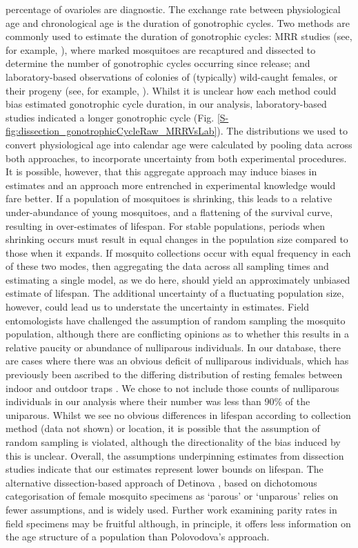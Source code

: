 \documentclass[]{article}
\begin{document}
percentage of ovarioles are diagnostic. The exchange rate between
physiological age and chronological age is the duration of gonotrophic
cycles. Two methods are commonly used to estimate the duration of
gonotrophic cycles: MRR studies (see, for example, \cite{gillies1965study}), where marked mosquitoes are recaptured and dissected to determine
the number of gonotrophic cycles occurring since release; and
laboratory-based observations of colonies of (typically) wild-caught
females, or their progeny (see, for example, \cite{afrane2005effects}).
Whilst it is unclear how each method could bias estimated gonotrophic
cycle duration, in our analysis, laboratory-based studies indicated a
longer gonotrophic cycle (Fig. \ref{S-fig:dissection_gonotrophicCycleRaw_MRRVsLab}). The distributions we used to
convert physiological age into calendar age were calculated by pooling
data across both approaches, to incorporate uncertainty from both
experimental procedures. It is possible, however, that this aggregate
approach may induce biases in estimates and an approach more entrenched
in experimental knowledge would fare better. If a population of
mosquitoes is shrinking, this leads to a relative under-abundance of
young mosquitoes, and a flattening of the survival curve, resulting in
over-estimates of lifespan. For stable populations, periods when
shrinking occurs must result in equal changes in the population size
compared to those when it expands. If mosquito collections occur with
equal frequency in each of these two modes, then aggregating the data
across all sampling times and estimating a single model, as we do here,
should yield an approximately unbiased estimate of lifespan. The
additional uncertainty of a fluctuating population size, however, could
lead us to understate the uncertainty in estimates. Field entomologists
have challenged the assumption of random sampling the mosquito
population, although there are conflicting opinions as to whether this
results in a relative paucity \citep{gillies1965study} or abundance
\citep{clements1981analysis} of nulliparous individuals. In our
database, there are cases where there was an obvious deficit of
nulliparous individuals, which has previously been ascribed to the
differing distribution of resting females between indoor and outdoor
traps \citep{detinova1962age,clements1981analysis}. We chose to not
include those counts of nulliparous individuals in our analysis where
their number was less than 90\% of the uniparous. Whilst we see no
obvious differences in lifespan according to collection method (data not
shown) or location, it is possible that the assumption of random
sampling is violated, although the directionality of the bias induced by
this is unclear. Overall, the assumptions underpinning estimates from
dissection studies indicate that our estimates represent lower bounds on
lifespan. The alternative dissection-based approach of Detinova
\cite{detinova1962age}, based on dichotomous categorisation of female mosquito
specimens as `parous' or `unparous' relies on fewer assumptions, and is
widely used. Further work examining parity rates in field specimens may
be fruitful although, in principle, it offers less information on the
age structure of a population than Polovodova's approach.
\end{document}
